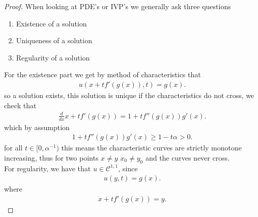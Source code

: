 \begin{proof}
 When looking at PDE's or IVP's we generally ask three questions 
 \begin{enumerate}
  \item Existence of  a solution 
  \item Uniqueness of a solution 
  \item Regularity of a solution 
 \end{enumerate}
 For the existence part we get by method of characteristics that 
 \begin{align*}
  u(x+t f'(g(x)),t) =  g(x)
 .\end{align*}
 so a solution exists, this solution is unique if the characteristics do not cross, we check that 
 \begin{align*}
  \frac{d}{dx} x + t f'(g(x)) = 1 + t f''(g(x))g'(x)
 .\end{align*}
 which by assumption 
 \begin{align*}
  1 + t f''(g(x))g'(x) \ge  1- t \alpha  > 0
 .\end{align*}
 for all $t \in  [0,\alpha ^{-1} )$ this means the characteristic curves are strictly monotone increasing,
 thus for two points $x\neq y$ $x_{0} \neq y_{0}$ and the curves never cross.\\
 For regularity, we have that $u \in  \mathcal{C}^{1,1} $, since 
 \begin{align*}
  u(y,t) = g(x) 
 .\end{align*}
 where 
 \begin{align*}
  x + t f'(g(x)) = y
 .\end{align*}
\end{proof}
